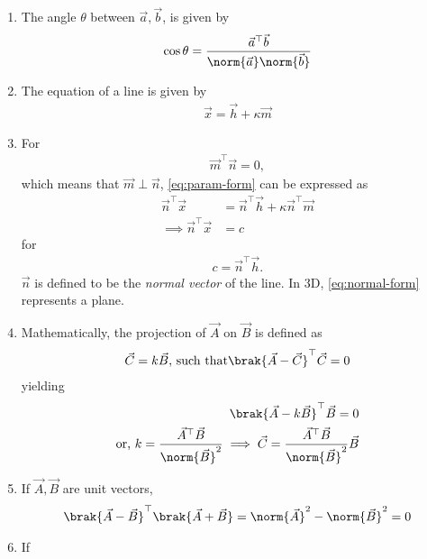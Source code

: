 \begin{enumerate}[label=\thesubsection.\arabic*.,ref=\thesubsection.\theenumi]
	\item The angle $\theta$ between $\vec{a}, \vec{b}$,
		is given by 
\begin{align}
	\label{eq:angle-inner}
		\cos\theta=\frac{{\vec{a}^{\top}}{\vec{b}}}{\norm{\vec{a}}\norm{\vec{b}}}
\end{align}
\item The equation of a line is given by 
\begin{align}
	\label{eq:param-form}
	\vec{x} = \vec{h} + \kappa \vec{m}
\end{align}
\item 
	For
\begin{align}
	\vec{m}^{\top}\vec{n} = 0,
\end{align}
which means that $\vec{m}\perp \vec{n}$,
	\eqref{eq:param-form} can be expressed as
\begin{align}
	\vec{n}^{\top}\vec{x} &= \vec{n}^{\top}\vec{h} + \kappa \vec{n}^{\top}\vec{m}
	\\
	\label{eq:normal-form}
	\implies	\vec{n}^{\top}\vec{x} &= c
\end{align}
for 
\begin{align}
c = 	\vec{n}^{\top}\vec{h}. 
\end{align}
$\vec{n}$ is defined to be the
{\em normal vector}
		of the line.  
	In 3D, \eqref{eq:normal-form} represents a plane.
	\item Mathematically, 
the projection of $\vec{A}$ on $\vec{B}$ is defined as
		\begin{align}
	\vec{C} = k \vec{B},\, \text{such that}
	\brak{\vec{A}-\vec{C}}^{\top}\vec{C} = 0
\end{align}
yielding
\begin{align}
	\brak{\vec{A}-k\vec{B}}^{\top}\vec{B} = 0
	\\
	\text{or, } k = 
	\frac{\vec{A}^{\top}\vec{B}}{\norm{\vec{B}}^2}
	\implies 
	\vec{C} = 
	\frac{\vec{A}^{\top}\vec{B}}{\norm{\vec{B}}^2}
 \vec{B}
	\label{eq:12/10/3/4/proj}
\end{align}
\item If $\vec{A}, \vec{B}$ are unit vectors, 
\begin{align}
	\brak{\vec{A}-\vec{B}}^{\top} 
	\brak{\vec{A}+\vec{B}} 
	=
\norm{\vec{A}}^2 - \norm{\vec{B}}^2
	= 0
	\label{eq:12/10/3/11/unit}
\end{align}
  \item If 
\begin{align}

\end{align}
\end{enumerate}
